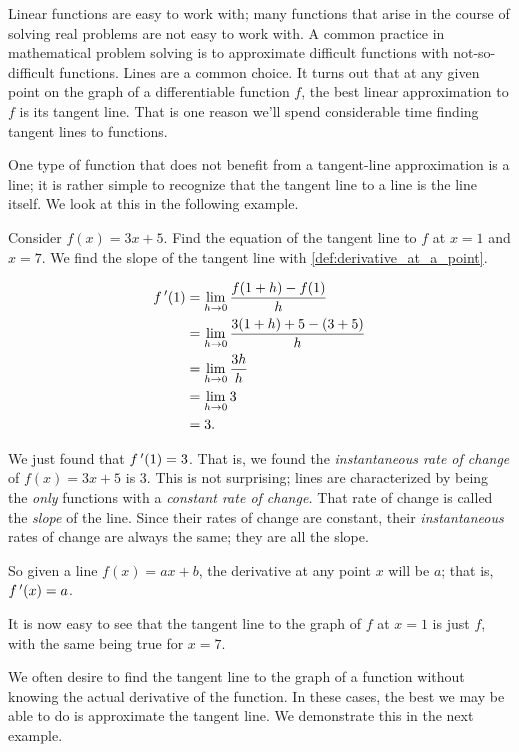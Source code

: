 Linear functions are easy to work with; many functions that arise in the course of solving real problems are not easy to work with. A common practice in mathematical problem solving is to approximate difficult functions with not-so-difficult functions. Lines are a common choice. It turns out that at any given point on the graph of a differentiable function $f$, the best linear approximation to $f$ is its tangent line. That is one reason we'll spend considerable time finding tangent lines to functions.

One type of function that does not benefit from a tangent-line approximation is a line; it is rather simple to recognize that the tangent line to a line is the line itself. We look at this in the following example.

\begin{example}\label{ex_der_line}%
Consider $f(x) = 3x+5$. Find the equation of the tangent line to $f$ at $x=1$ and $x=7$.
\solution
We find the slope of the tangent line with \autoref{def:derivative_at_a_point}.

	\begin{align*}
	f\,'(1) &=	\lim_{h\to 0}\frac{f(1+h)-f(1)}{h} \\
					&=	\lim_{h\to 0} \frac{3(1+h)+5 - (3+5)}{h}\\
					&=	\lim_{h\to 0} \frac{3h}{h}\\
					&=	\lim_{h\to 0} 3\\
					&= 3.
	\end{align*}
	
We just found that $f\,'(1) = 3$. That is, we found the \emph{instantaneous rate of change} of $f(x) = 3x+5$ is $3$. This is not surprising; lines are characterized by being the \emph{only} functions with a \emph{constant rate of change.} That rate of change is called the \emph{slope} of the line. Since their rates of change are constant, their \emph{instantaneous} rates of  change are always the same; they are all the slope.

So given a line $f(x) = ax+b$, the derivative at any point $x$ will be $a$; that is, $f\,'(x) = a$. 

It is now easy to see that the tangent line to the graph of $f$ at $x=1$ is just $f$, with the same being true for $x=7$.
\end{example}

We often desire to find the tangent line to the graph of a function without knowing the actual derivative of the function. In these cases, the best we may be able to do is approximate the tangent line. We demonstrate this in the next example.

